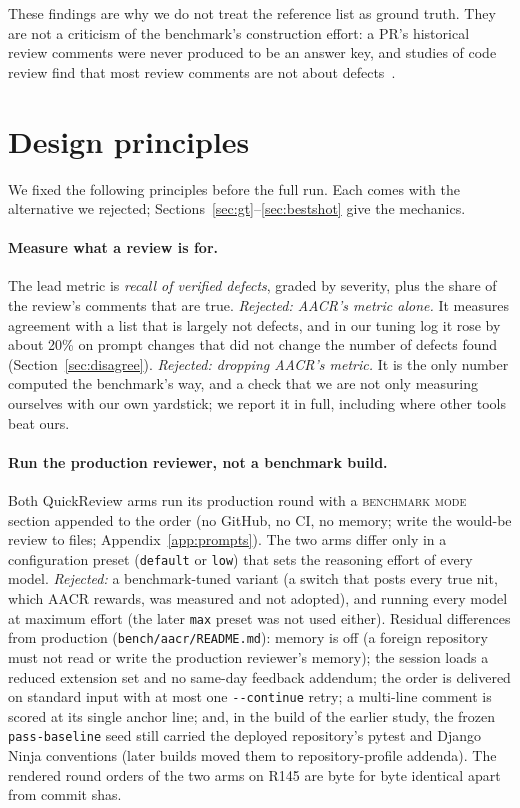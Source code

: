 \documentclass[11pt,a4paper]{article}
\newcommand{\qcr}{QuickReview}
\newcommand{\code}[1]{\texttt{#1}}
\begin{document}
These findings are why we do not treat the reference list as ground truth.
They are not a criticism of the benchmark's construction effort: a PR's
historical review comments were never produced to be an answer key, and
studies of code review find that most review comments are not about
defects~\cite{bacchelli2013,mantyla2009,beller2014}.

\section{Design principles}
\label{sec:principles}

We fixed the following principles before the full run. Each comes with the
alternative we rejected; Sections~\ref{sec:gt}--\ref{sec:bestshot} give the
mechanics.

\paragraph{Measure what a review is for.} The lead metric is \emph{recall
of verified defects}, graded by severity, plus the share of the review's
comments that are true. \emph{Rejected: AACR's metric alone.} It measures
agreement with a list that is largely not defects, and in our tuning log it
rose by about 20\% on prompt changes that did not change the number of
defects found (Section~\ref{sec:disagree}). \emph{Rejected: dropping AACR's
metric.} It is the only number computed the benchmark's way, and a check
that we are not only measuring ourselves with our own yardstick; we report
it in full, including where other tools beat ours.

\paragraph{Run the production reviewer, not a benchmark build.} Both \qcr{}
arms run its production round with a \textsc{benchmark mode} section
appended to the order (no GitHub, no CI, no memory; write the would-be
review to files; Appendix~\ref{app:prompts}). The two arms differ only in
a configuration preset (\code{default} or \code{low}) that sets the
reasoning effort of every model. \emph{Rejected:} a benchmark-tuned variant
(a switch that posts every true nit, which AACR rewards, was measured and
not adopted), and running every model at maximum effort (the later
\code{max} preset was not used either). Residual differences from
production (\code{bench/aacr/README.md}): memory is off (a foreign
repository must not read or write the production reviewer's memory); the
session loads a reduced extension set and no same-day feedback addendum;
the order is delivered on standard input with at most one
\code{-{}-continue} retry; a multi-line comment is scored at its single
anchor line; and, in the build of the earlier study, the frozen
\code{pass-baseline} seed still carried the deployed repository's pytest
and Django Ninja conventions (later builds moved them to repository-profile
addenda). The rendered round orders of the two arms on R145 are byte for
byte identical apart from commit shas.
\end{document}
